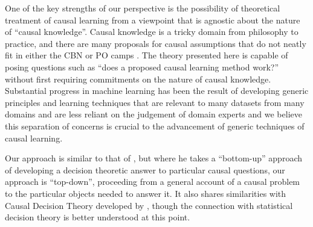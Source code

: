 One of the key strengths of our perspective is the possibility of theoretical treatment of causal learning from a viewpoint that is agnostic about the nature of ``causal knowledge''. Causal knowledge is a tricky domain from philosophy to practice, and there are many proposals for causal assumptions that do not neatly fit in either the CBN or PO camps \citep{bongers_theoretical_2016,dawid_beware_2010,bengio_meta-transfer_2019}. The theory presented here is capable of posing questions such as ``does a proposed causal learning method work?'' without first requiring commitments on the nature of causal knowledge. Substantial progress in machine learning has been the result of developing generic principles and learning techniques that are relevant to many datasets from many domains and are less reliant on the judgement of domain experts and we believe this separation of concerns is crucial to the advancement of generic techniques of causal learning.

Our approach is similar to that of \cite{dawid_decision-theoretic_2012}, but where he takes a ``bottom-up'' approach of developing a decision theoretic answer to particular causal questions, our approach is ``top-down'', proceeding from a general account of a causal problem to the particular objects needed to answer it. It also shares similarities with Causal Decision Theory developed by \cite{lewis_causal_1981}, though the connection with statistical decision theory is better understood at this point.




